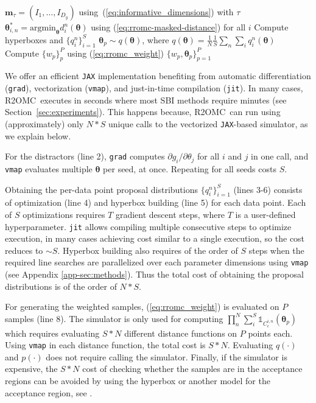 \documentclass[twoside]{article}
\newcommand{\thb}{\boldsymbol{\theta}}
\newcommand{\ub}{\mathbf{u}}
\newcommand{\data}{\mathbf{y}^o}
\newcommand{\rromc}{R2OMC}
\newcommand{\mask}{\mathbf{m}_\tau}
\begin{document}
\begin{algorithm}[!ht]
  \caption{\texttt{R2OMC}. Requires: $p(\thb), g(\thb, \ub), \{\data_n\}_{n=1}^{N}$}
  \label{alg:r2omc}
  \begin{algorithmic}[1]
    \Procedure{\rromc}{$\tau, S, P$}
      \State $\mask = (I_1, \ldots, I_{D_{y}})$ using~(\ref{eq:informative_dimensions}) with $\tau$ 
      \State $\thb_{i,n}^* = \text{argmin}_{\thb} d_i^n(\thb)$ using (\ref{eq:rromc-masked-distance}) for all $i$
      \State Compute hyperboxes and $\{q_i^n\}_{i=1}^S$
    \EndFor
    \State $\thb_p \sim q(\thb)$, where $ q(\thb)= \frac{1}{N} \frac{1}{S} \sum_n \sum_i q_i^n (\thb)$
    \State Compute $\{w_p\}_p^P $ using (\ref{eq:rromc_weight})
    \State \Return $\{w_p, \thb_p\}_{p=1}^{P}$ 
    \EndProcedure
  \end{algorithmic}
\end{algorithm}

We offer an efficient \texttt{JAX} implementation benefiting from automatic differentiation (\texttt{grad}), vectorization (\texttt{vmap}), and just-in-time compilation (\texttt{jit}). 
In many cases, \rromc~executes in seconds where most SBI methods require minutes (see Section~\ref{sec:experiments}). 
This happens because, \rromc~can run using (approximately) only $N * S$ unique calls to the vectorized \texttt{JAX}-based simulator, as we explain below.

For the distractors (line 2), \texttt{grad} computes $\partial g_i/\partial \theta_j$ for all $i$ and $j$ in one call, and \texttt{vmap} evaluates multiple $\thb$ per seed, at once.
Repeating for all seeds costs $S$. 

Obtaining the per-data point proposal distributions $\{q_i^n\}_{i=1}^S$ (lines 3-6) consists of optimization (line 4) and hyperbox building (line 5) for each data point. Each of $S$ optimizations requires $T$ gradient descent steps, where $T$ is a user-defined hyperparameter. \texttt{jit} allows compiling multiple consecutive steps to optimize execution, in many cases achieving cost similar to a single execution, so the cost reduces to $\sim S$. Hyperbox building also requires of the order of $S$ steps when the required line searches are parallelized over each parameter dimensions using \texttt{vmap} (see Appendix \ref{app-sec:methods}). 
Thus the total cost of obtaining the proposal distributions is of the order of $N*S$. 

For generating the weighted samples, (\ref{eq:rromc_weight}) is evaluated on $P$ samples (line 8).
The simulator is only used for computing $\prod_n^N \sum_i^S \mathbb{1}_{C_{\epsilon}^{i,n}}(\thb_p)$ which requires evaluating $S * N$ different distance functions on $P$ points each. Using \texttt{vmap} in each distance function, the total cost is $S * N$. Evaluating $q(\cdot)$ and $p(\cdot)$ does not require calling the simulator. Finally, if the simulator is expensive, the $S *N$ cost of checking whether the samples are in the acceptance regions can be avoided by using the hyperbox or another model for the acceptance region, see \citet{ikonomov2020robust}. 
\end{document}
